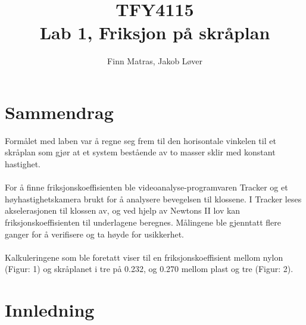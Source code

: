 \documentclass[10pt,a4paper]{report}
\author{Finn Matras, Jakob Løver}
\title{{\LARGE TFY4115}\\{\large Lab 1, Friksjon på skråplan}}
\begin{document}
\renewcommand{\contentsname}{Innhold}
\renewcommand{\cftchapleader}{\cftdotfill{\cftdotsep}}
\renewcommand{\cftpartleader}{\cftdotfill{\cftdotsep}}

\maketitle
\tableofcontents

\chapter*{Sammendrag}
Formålet med laben var å regne seg frem til den horisontale vinkelen til et skråplan som gjør at et system bestående av to masser sklir med konstant hastighet.\\
\\For å finne friksjonskoeffisienten ble videoanalyse-programvaren Tracker og et høyhastighetskamera brukt for å analysere bevegelsen til klossene. I Tracker leses akselerasjonen til klossen av, og ved hjelp av Newtons II lov kan friksjonskoeffisienten til underlagene beregnes. Målingene ble gjenntatt flere ganger for å verifisere og ta høyde for usikkerhet.\\
\\Kalkuleringene som ble foretatt viser til en friksjonskoeffisient mellom nylon (Figur: 1) og skråplanet i tre på 0.232, og 0.270 mellom plast og tre (Figur: 2).


\chapter*{Innledning}
\end{document}
